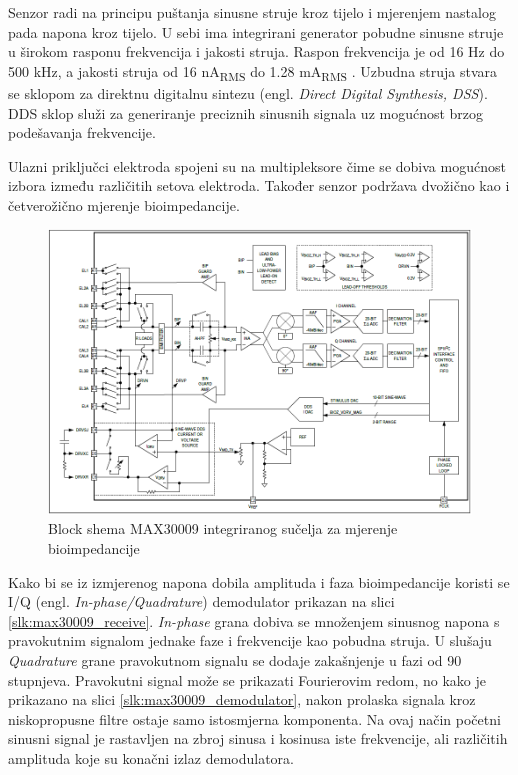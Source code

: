 \documentclass[../diplomski_rad.tex]{subfiles}
\begin{document}
Senzor radi na principu puštanja sinusne struje kroz tijelo i mjerenjem nastalog pada napona kroz tijelo. 
U sebi ima integrirani generator pobudne sinusne struje u širokom rasponu frekvencija i jakosti struja. 
Raspon frekvencija je od 16 Hz do 500 kHz, a jakosti struja od 16 nA\textsubscript{RMS} do 1.28 mA\textsubscript{RMS} \cite{max30009}.
Uzbudna struja stvara se sklopom za direktnu digitalnu sintezu (engl. \textit{Direct Digital Synthesis, DSS}). 
DDS sklop služi za generiranje preciznih sinusnih signala uz mogućnost brzog podešavanja frekvencije.  

Ulazni priključci elektroda spojeni su na multipleksore čime se dobiva mogućnost izbora 
između različitih setova elektroda. Također senzor podržava dvožično kao i četverožično mjerenje bioimpedancije.

\begin{figure}[htb]
    \centering
    \includegraphics[width=1\textwidth]{Figures/max30009_bioz.png} 
    \caption{Block shema MAX30009 integriranog sučelja za mjerenje bioimpedancije \cite{max30009_datasheet}}
    \label{slk:max30009_bioz}
\end{figure}

Kako bi se iz izmjerenog napona dobila amplituda i faza bioimpedancije koristi se I/Q (engl. \textit{In-phase/Quadrature}) 
demodulator prikazan na slici \ref{slk:max30009_receive}. 
\textit{In-phase} grana dobiva se množenjem sinusnog napona s pravokutnim signalom jednake faze i frekvencije kao pobudna struja.
U slušaju \textit{Quadrature} grane pravokutnom signalu se dodaje zakašnjenje u fazi od 90 stupnjeva.  
Pravokutni signal može se prikazati Fourierovim redom, no kako je prikazano na slici \ref{slk:max30009_demodulator}, 
nakon prolaska signala kroz niskopropusne filtre ostaje samo istosmjerna komponenta. 
Na ovaj način početni sinusni signal je rastavljen na zbroj sinusa i kosinusa iste frekvencije, ali različitih amplituda koje su 
konačni izlaz demodulatora.
\end{document}
